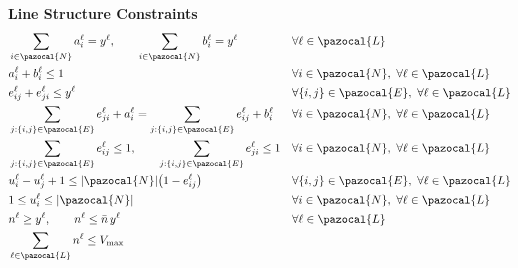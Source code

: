 \documentclass[11pt,a4paper]{article} %
\begin{document}
\textbf{Line Structure Constraints}
\begingroup
\allowdisplaybreaks[4]
\setlength{\jot}{0pt}
\begin{align}
& \sum_{i \in \pazocal{N}} a_i^\ell = y^\ell, \qquad
  \sum_{i \in \pazocal{N}} b_i^\ell = y^\ell
&& \forall \ell \in \pazocal{L} \label{st:term_existence}\\
& a_i^\ell + b_i^\ell \le 1
&& \forall i \in \pazocal{N},\ \forall \ell \in \pazocal{L} \label{st:term_distinct}\\
& e_{ij}^\ell + e_{ji}^\ell \le y^\ell
&& \forall \{i,j\} \in \pazocal{E},\ \forall \ell \in \pazocal{L} \label{st:edge_activation}\\
& \sum_{j:\{i,j\} \in \pazocal{E}} e_{ji}^\ell + a_i^\ell
=
\sum_{j:\{i,j\} \in \pazocal{E}} e_{ij}^\ell + b_i^\ell
&& \forall i \in \pazocal{N},\ \forall \ell \in \pazocal{L} \label{st:flow_balance}\\
& \sum_{j:\{i,j\} \in \pazocal{E}} e_{ij}^\ell \le 1, \qquad
  \sum_{j:\{i,j\} \in \pazocal{E}} e_{ji}^\ell \le 1
&& \forall i \in \pazocal{N},\ \forall \ell \in \pazocal{L} \label{st:simple_path}\\
& u_i^\ell - u_j^\ell + 1
\le |\pazocal{N}| \big(1-e_{ij}^\ell\big)
&& \forall \{i,j\} \in \pazocal{E},\ \forall \ell \in \pazocal{L} \label{st:mtz_fwd}
\\
& 1 \le u_i^\ell \le |\pazocal{N}|
&& \forall i \in \pazocal{N},\ \forall \ell \in \pazocal{L} \label{st:mtz_bound}\\
& n^\ell \ge y^\ell, \qquad
  n^\ell \le \bar n \, y^\ell
&& \forall \ell \in \pazocal{L} \label{st:veh_bounds}\\
& \sum_{\ell \in \pazocal{L}} n^\ell \le V_{\max}
&& \label{st:veh_budget}
\end{align}
\endgroup
\end{document}
